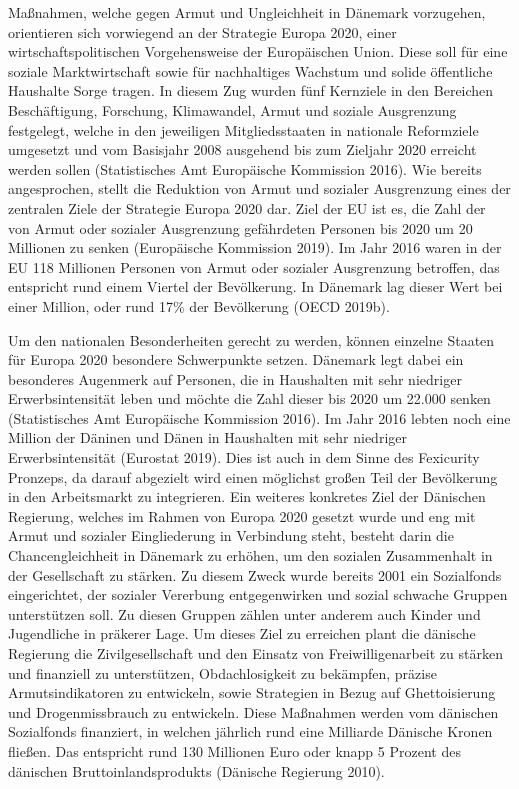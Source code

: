 \documentclass[12pt,]{article}
\begin{document}
Maßnahmen, welche gegen Armut und Ungleichheit in Dänemark vorzugehen,
orientieren sich vorwiegend an der Strategie Europa 2020, einer
wirtschaftspolitischen Vorgehensweise der Europäischen Union. Diese soll
für eine soziale Marktwirtschaft sowie für nachhaltiges Wachstum und
solide öffentliche Haushalte Sorge tragen. In diesem Zug wurden fünf
Kernziele in den Bereichen Beschäftigung, Forschung, Klimawandel, Armut
und soziale Ausgrenzung festgelegt, welche in den jeweiligen
Mitgliedsstaaten in nationale Reformziele umgesetzt und vom Basisjahr
2008 ausgehend bis zum Zieljahr 2020 erreicht werden sollen
(Statistisches Amt Europäische Kommission 2016). Wie bereits
angesprochen, stellt die Reduktion von Armut und sozialer Ausgrenzung
eines der zentralen Ziele der Strategie Europa 2020 dar. Ziel der EU ist
es, die Zahl der von Armut oder sozialer Ausgrenzung gefährdeten
Personen bis 2020 um 20 Millionen zu senken (Europäische Kommission
2019). Im Jahr 2016 waren in der EU 118 Millionen Personen von Armut
oder sozialer Ausgrenzung betroffen, das entspricht rund einem Viertel
der Bevölkerung. In Dänemark lag dieser Wert bei einer Million, oder
rund 17\% der Bevölkerung (OECD 2019b).

Um den nationalen Besonderheiten gerecht zu werden, können einzelne
Staaten für Europa 2020 besondere Schwerpunkte setzen. Dänemark legt
dabei ein besonderes Augenmerk auf Personen, die in Haushalten mit sehr
niedriger Erwerbsintensität leben und möchte die Zahl dieser bis 2020 um
22.000 senken (Statistisches Amt Europäische Kommission 2016). Im Jahr
2016 lebten noch eine Million der Däninen und Dänen in Haushalten mit
sehr niedriger Erwerbsintensität (Eurostat 2019). Dies ist auch in dem
Sinne des Fexicurity Pronzeps, da darauf abgezielt wird einen möglichst
großen Teil der Bevölkerung in den Arbeitsmarkt zu integrieren. Ein
weiteres konkretes Ziel der Dänischen Regierung, welches im Rahmen von
Europa 2020 gesetzt wurde und eng mit Armut und sozialer Eingliederung
in Verbindung steht, besteht darin die Chancengleichheit in Dänemark zu
erhöhen, um den sozialen Zusammenhalt in der Gesellschaft zu stärken. Zu
diesem Zweck wurde bereits 2001 ein Sozialfonds eingerichtet, der
sozialer Vererbung entgegenwirken und sozial schwache Gruppen
unterstützen soll. Zu diesen Gruppen zählen unter anderem auch Kinder
und Jugendliche in präkerer Lage. Um dieses Ziel zu erreichen plant die
dänische Regierung die Zivilgesellschaft und den Einsatz von
Freiwilligenarbeit zu stärken und finanziell zu unterstützen,
Obdachlosigkeit zu bekämpfen, präzise Armutsindikatoren zu entwickeln,
sowie Strategien in Bezug auf Ghettoisierung und Drogenmissbrauch zu
entwickeln. Diese Maßnahmen werden vom dänischen Sozialfonds finanziert,
in welchen jährlich rund eine Milliarde Dänische Kronen fließen. Das
entspricht rund 130 Millionen Euro oder knapp 5 Prozent des dänischen
Bruttoinlandsprodukts (Dänische Regierung 2010).
\end{document}
